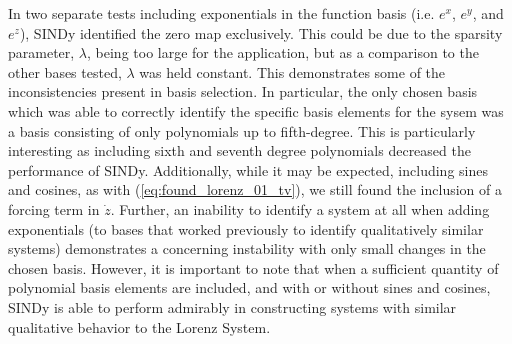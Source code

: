 \documentclass[10pt]{paper}
\begin{document}
In two separate tests including exponentials in the function basis (i.e. $e^x$, $e^y$, and $e^z$), SINDy identified the zero map exclusively. This could be due to the sparsity parameter, $\lambda$, being too large for the application, but as a comparison to the other bases tested, $\lambda$ was held constant. 
This demonstrates some of the inconsistencies present in basis selection. In particular, the only chosen basis which was able to correctly identify the specific basis elements for the sysem was a basis consisting of only polynomials up to fifth-degree. 
This is particularly interesting as including sixth and seventh degree polynomials decreased the performance of SINDy. Additionally, while it may be expected, including sines and cosines, as with (\ref{eq:found_lorenz_01_tv}), we still found the inclusion of a forcing term in $\dot z$. 
Further, an inability to identify a system at all when adding exponentials (to bases that worked previously to identify qualitatively similar systems) demonstrates a concerning instability with only small changes in the chosen basis. 
However, it is important to note that when a sufficient quantity of polynomial basis elements are included, and with or without sines and cosines, SINDy is able to perform admirably in constructing systems with similar qualitative behavior to the Lorenz System. 
\end{document}
